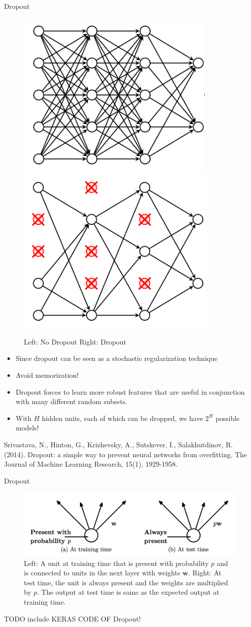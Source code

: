 \documentclass[xcolor=pdftex,dvipsnames,table,mathserif]{beamer}
\begin{document}
\begin{frame}{Dropout}
\begin{figure}
\includegraphics[width=.45 \columnwidth]{../graphics/NetworkDropoutNo}
\includegraphics[width=.45 \columnwidth]{../graphics/NetworkDropoutYes}
\caption{Left: No Dropout Right: Dropout}
\end{figure}
\begin{itemize}
\item Since dropout can be seen as a stochastic regularization technique
\item Avoid memorization!
\item Dropout forces to learn more robust features that are useful in conjunction with many different random subsets.
\item With $H$ hidden units, each of which can be dropped, we have $2^H$ possible models!
\end{itemize}
Srivastava, N., Hinton, G., Krizhevsky, A., Sutskever, I.,  Salakhutdinov, R. (2014). Dropout: a simple way to prevent neural networks from overfitting. The Journal of Machine Learning Research, 15(1), 1929-1958.
\end{frame}

\begin{frame}{Dropout}
\begin{figure}
\includegraphics[width=.85 \columnwidth]{../graphics/DropoutP}
\caption{Left: A unit at training time that is present with probability $p$ and is connected to units
in the next layer with weights $\mathbf{w}$. Right: At test time, the unit is always present and
the weights are multiplied by $p$. The output at test time is same as the expected output
at training time.}
\end{figure}
\end{frame}


\begin{frame}
TODO include KERAS CODE OF Dropout!
\end{frame}
	


\end{document}
